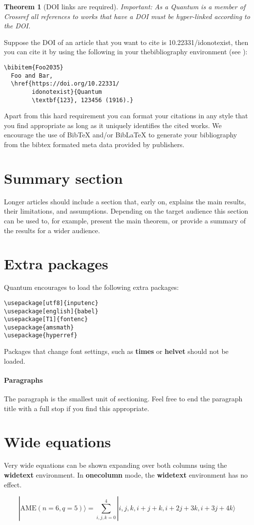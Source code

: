 \documentclass[prx,a4paper,aps,twocolumn,superscriptaddress,11pt]{quantumarticle}
\newtheorem{theorem}{Theorem}
\begin{document}
\begin{theorem}[DOI links are required]
  Important: As a Quantum is a member of Crossref all references to works that have a DOI must be hyper-linked according to the DOI.
\end{theorem}
Suppose the DOI of an article that you want to cite is 10.22331/idonotexist, then you can cite it by using the following in your thebibliography environment (see \cite{Foo2035}):
\begin{verbatim}
\bibitem{Foo2035}
  Foo and Bar, 
  \href{https://doi.org/10.22331/
        idonotexist}{Quantum 
        \textbf{123}, 123456 (1916).}
\end{verbatim}
Apart from this hard requirement you can format your citations in any style that you find appropriate as long as it uniquely identifies the cited works.
We encourage the use of BibTeX and/or BibLaTeX to generate your bibliography from the bibtex formated meta data provided by publishers.

\section{Summary section}
\label{sec:sec1}
Longer articles should include a section that, early on, explains the main results, their limitations, and assumptions.
Depending on the target audience this section can be used to, for example, present the main theorem, or provide a summary of the results for a wider audience.

\section{Extra packages}
Quantum encourages to load the following extra packages: 
\begin{verbatim}
\usepackage[utf8]{inputenc}
\usepackage[english]{babel}
\usepackage[T1]{fontenc}
\usepackage{amsmath}  
\usepackage{hyperref}
\end{verbatim}
Packages that change font settings, such as \textbf{times} or \textbf{helvet} should not be loaded.

\paragraph{Paragraphs}
The paragraph is the smallest unit of sectioning.
Feel free to end the paragraph title with a full stop if you find this appropriate.

\section{Wide equations}
Very wide equations can be shown expanding over both columns using the \textbf{widetext} environment.
In \textbf{onecolumn} mode, the \textbf{widetext} environment has no effect.
\begin{widetext}
  \begin{equation}
|\mathrm{AME}(n=6,q=5)\rangle=\sum_{i,j,k=0}^4 |i,j,k,i+j+k,i+2j+3k,i+3j+4k\rangle
  \end{equation}
\end{widetext}
\end{document}
